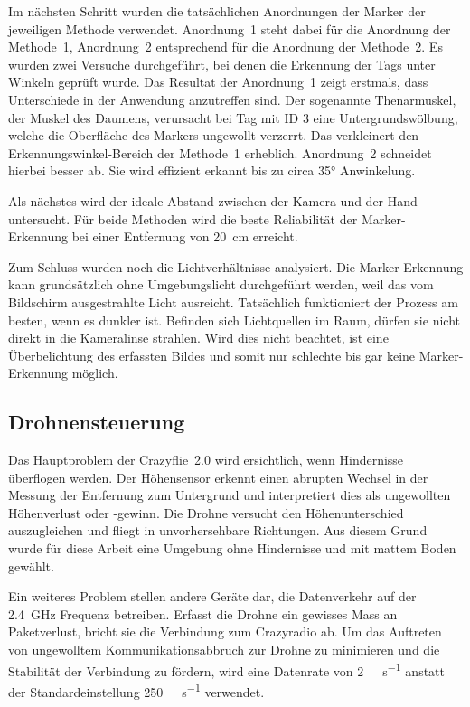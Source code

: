 Im nächsten Schritt wurden die tatsächlichen Anordnungen der Marker der jeweiligen Methode verwendet.
Anordnung~1 steht dabei für die Anordnung der Methode~1, Anordnung~2 entsprechend für die Anordnung der Methode~2.
Es wurden zwei Versuche durchgeführt, bei denen die Erkennung der Tags unter Winkeln geprüft wurde.
Das Resultat der Anordnung~1 zeigt erstmals, dass Unterschiede in der Anwendung anzutreffen sind.
Der sogenannte Thenarmuskel, der Muskel des Daumens, verursacht bei Tag mit ID 3 eine Untergrundswölbung, welche die Oberfläche des Markers ungewollt verzerrt.
Das verkleinert den Erkennungswinkel-Bereich der Methode~1 erheblich.
Anordnung~2 schneidet hierbei besser ab.
Sie wird effizient erkannt bis zu circa 35° Anwinkelung\footnotemark{}.

Als nächstes wird der ideale Abstand zwischen der Kamera und der Hand untersucht.
Für beide Methoden wird die beste Reliabilität der Marker-Erkennung bei einer Entfernung von \SI{20}{\centi\meter} erreicht.

Zum Schluss wurden noch die Lichtverhältnisse analysiert.
Die Marker-Erkennung kann grundsätzlich ohne Umgebungslicht durchgeführt werden, weil das vom Bildschirm ausgestrahlte Licht ausreicht.
Tatsächlich funktioniert der Prozess am besten, wenn es dunkler ist.
Befinden sich Lichtquellen im Raum, dürfen sie nicht direkt in die Kameralinse strahlen.
Wird dies nicht beachtet, ist eine Überbelichtung des erfassten Bildes und somit nur schlechte bis gar keine Marker-Erkennung möglich.

\subsection{Drohnensteuerung}
\label{sec:drco}

Das Hauptproblem der Crazyflie~2.0 wird ersichtlich, wenn Hindernisse überflogen werden.
Der Höhensensor erkennt einen abrupten Wechsel in der Messung der Entfernung zum Untergrund und interpretiert dies als ungewollten Höhenverlust oder -gewinn.
Die Drohne versucht den Höhenunterschied auszugleichen und fliegt in unvorhersehbare Richtungen.
Aus diesem Grund wurde für diese Arbeit eine Umgebung ohne Hindernisse und mit mattem Boden gewählt.

Ein weiteres Problem stellen andere Geräte dar, die Datenverkehr auf der \SI{2.4}{\giga\hertz} Frequenz betreiben.
Erfasst die Drohne ein gewisses Mass an Paketverlust, bricht sie die Verbindung zum Crazyradio ab.
Um das Auftreten von ungewolltem Kommunikationsabbruch zur Drohne zu minimieren und die Stabilität der Verbindung zu fördern, wird eine Datenrate von \SI{2}{\mega\bit\per\second} anstatt der Standardeinstellung \SI{250}{\kilo\bit\per\second} verwendet.

